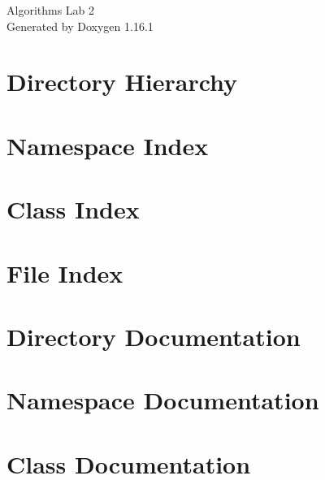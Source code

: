 \documentclass[twoside]{book}
\newcommand{\+}{\discretionary{\mbox{\scriptsize$\hookleftarrow$}}{}{}}
\newcommand{\clearemptydoublepage}{%
    \newpage{\pagestyle{empty}\cleardoublepage}%
  }
\begin{document}
  \raggedbottom
    \hypersetup{pageanchor=false,
                bookmarksnumbered=true,
                pdfencoding=unicode
               }
  \begin{titlepage}
  \vspace*{7cm}
  \begin{center}%
  {\Large Algorithms Lab 2}\\
  \vspace*{1cm}
  {\large Generated by Doxygen 1.16.1}\\
  \end{center}
  \end{titlepage}
  \clearemptydoublepage
  \tableofcontents
  \clearemptydoublepage
  \hypersetup{pageanchor=true}
\chapter{Directory Hierarchy}

\chapter{Namespace Index}

\chapter{Class Index}

\chapter{File Index}

\chapter{Directory Documentation}

\chapter{Namespace Documentation}



\chapter{Class Documentation}





\end{document}
